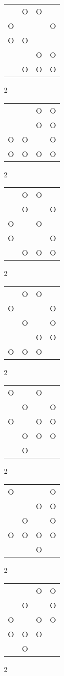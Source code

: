 \begin{tabular}{|m{0.2cm}m{0.2cm}m{0.2cm}m{0.2cm}|}\hline
 &O&O& \\
O& & &O\\
O&O& & \\
 & &O&O\\
 &O&O&O\\
\hline\end{tabular}2
\begin{tabular}{|m{0.2cm}m{0.2cm}m{0.2cm}m{0.2cm}|}\hline
 & &O&O\\
 & &O&O\\
O&O& &O\\
O&O&O&O\\
\hline\end{tabular}2
\begin{tabular}{|m{0.2cm}m{0.2cm}m{0.2cm}m{0.2cm}|}\hline
 &O&O& \\
 &O& &O\\
O& &O& \\
O& & &O\\
 &O&O&O\\
\hline\end{tabular}2
\begin{tabular}{|m{0.2cm}m{0.2cm}m{0.2cm}m{0.2cm}|}\hline
 &O&O& \\
O& & &O\\
 &O& &O\\
 & &O&O\\
O&O&O& \\
\hline\end{tabular}2
\begin{tabular}{|m{0.2cm}m{0.2cm}m{0.2cm}m{0.2cm}|}\hline
O& &O& \\
 &O& &O\\
O& &O&O\\
 &O&O&O\\
 &O& & \\
\hline\end{tabular}2
\begin{tabular}{|m{0.2cm}m{0.2cm}m{0.2cm}m{0.2cm}|}\hline
O& & &O\\
 & &O&O\\
 &O& &O\\
O&O&O&O\\
 & &O& \\
\hline\end{tabular}2
\begin{tabular}{|m{0.2cm}m{0.2cm}m{0.2cm}m{0.2cm}|}\hline
 & &O&O\\
 &O& &O\\
O& &O&O\\
O&O&O& \\
 &O& & \\
\hline\end{tabular}2
